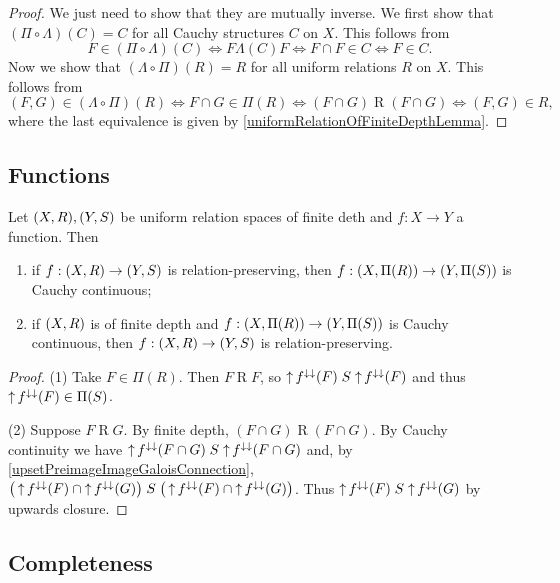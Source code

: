 \begin{proof}
We just need to show that they are mutually inverse. We first show that $(\Pi\circ\Lambda)(C) = C$ for all Cauchy structures $C$ on $X$. This follows from
\[ F\in (\Pi\circ\Lambda)(C) \iff F\mathrel{\Lambda(C)}F \iff F\cap F \in C \iff F\in C. \]
Now we show that $(\Lambda \circ\Pi)(R) = R$ for all uniform relations $R$ on $X$. This follows from
\[ (F, G)\in (\Lambda \circ\Pi)(R) \iff F\cap G\in \Pi(R) \iff (F\cap G)\mathrel{R}(F\cap G) \iff (F,G)\in R, \]
where the last equivalence is given by \ref{uniformRelationOfFiniteDepthLemma}.
\end{proof}

\subsection{Functions}

\begin{proposition} \label{CauchyContinuousUniformRelationPreserving}
Let $\sSet{X,R}, \sSet{Y,S}$ be uniform relation spaces of finite deth and $f: X\to Y$ a function. Then
\begin{enumerate}
\item if $f: \sSet{X, R} \to \sSet{Y, S}$ is relation-preserving, then $f: \sSet{X, \Pi(R)} \to \sSet{Y, \Pi(S)}$ is Cauchy continuous;
\item if $\sSet{X,R}$ is of finite depth and $f: \sSet{X, \Pi(R)} \to \sSet{Y, \Pi(S)}$ is Cauchy continuous, then $f: \sSet{X, R} \to \sSet{Y, S}$ is relation-preserving.
\end{enumerate}
\end{proposition}
\begin{proof}
(1) Take $F\in \Pi(R)$. Then $F\mathrel{R}F$, so $\operatorname{\uparrow} f^{\downarrow\downarrow}(F)\mathrel{S} \operatorname{\uparrow} f^{\downarrow\downarrow}(F)$ and thus $\operatorname{\uparrow} f^{\downarrow\downarrow}(F)\in \Pi(S)$.

(2) Suppose $F\mathrel{R}G$. By finite depth, $(F\cap G)\mathrel{R}(F\cap G)$. By Cauchy continuity we have $\operatorname{\uparrow} f^{\downarrow\downarrow}(F\cap G)\mathrel{S} \operatorname{\uparrow} f^{\downarrow\downarrow}(F\cap G)$ and, by \ref{upsetPreimageImageGaloisConnection}, $\big(\operatorname{\uparrow} f^{\downarrow\downarrow}(F)\cap \operatorname{\uparrow} f^{\downarrow\downarrow}(G)\big)\mathrel{S} \big(\operatorname{\uparrow} f^{\downarrow\downarrow}(F) \cap \operatorname{\uparrow} f^{\downarrow\downarrow}(G)\big)$. Thus $\operatorname{\uparrow} f^{\downarrow\downarrow}(F)\mathrel{S} \operatorname{\uparrow} f^{\downarrow\downarrow}(G)$ by upwards closure.
\end{proof}

\subsection{Completeness}

